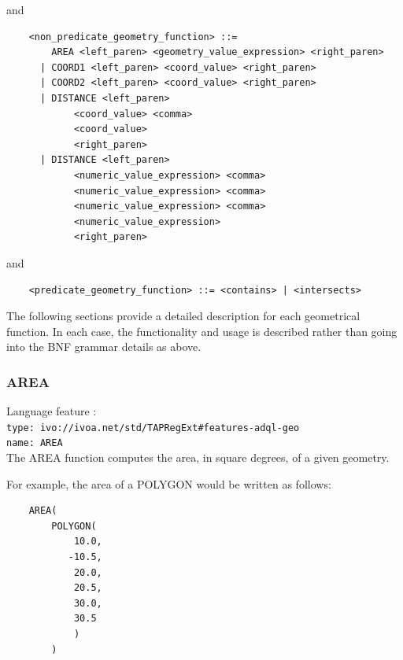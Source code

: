 \documentclass[11pt,a4paper]{ivoa}
\begin{document}
and

\begin{verbatim}
    <non_predicate_geometry_function> ::=
        AREA <left_paren> <geometry_value_expression> <right_paren>
      | COORD1 <left_paren> <coord_value> <right_paren>
      | COORD2 <left_paren> <coord_value> <right_paren>
      | DISTANCE <left_paren>
            <coord_value> <comma>
            <coord_value>
            <right_paren>
      | DISTANCE <left_paren>
            <numeric_value_expression> <comma>
            <numeric_value_expression> <comma>
            <numeric_value_expression> <comma>
            <numeric_value_expression>
            <right_paren>
\end{verbatim}

and

\begin{verbatim}
    <predicate_geometry_function> ::= <contains> | <intersects>
\end{verbatim}

\clearpage
\label{sec:functions.geom.definitions}

The following sections provide a detailed description for each geometrical
function. In each case, the functionality and usage is described rather
than going into the BNF grammar details as above.

\subsubsection{AREA}
\label{sec:functions.geom.area}
{\footnotesize Language feature :}\\
{\footnotesize \verb|type: ivo://ivoa.net/std/TAPRegExt#features-adql-geo|}\\
{\footnotesize \verb|name: AREA|}\\

The AREA function computes the area, in square degrees, of a given geometry.

For example, the area of a POLYGON would be written as follows:

\begin{verbatim}
    AREA(
        POLYGON(
            10.0,
           -10.5,
            20.0,
            20.5,
            30.0,
            30.5
            )
        )
\end{verbatim}
\end{document}

